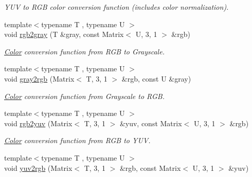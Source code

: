 \begin{DoxyCompactItemize}
\begin{DoxyCompactList}\small\item\em Y\-U\-V to R\-G\-B color conversion function (includes color normalization). \end{DoxyCompactList}\item 
\hypertarget{group___color_conversion_gaaa9282cb999d6cb7301efd2c69b8f921}{{\footnotesize template$<$typename T , typename U $>$ }\\void \hyperlink{group___color_conversion_gaaa9282cb999d6cb7301efd2c69b8f921}{rgb2gray} (T \&gray, const Matrix$<$ U, 3, 1 $>$ \&rgb)}\label{group___color_conversion_gaaa9282cb999d6cb7301efd2c69b8f921}

\begin{DoxyCompactList}\small\item\em \hyperlink{class_d_o_1_1_color}{Color} conversion function from R\-G\-B to Grayscale. \end{DoxyCompactList}\item 
\hypertarget{group___color_conversion_gacf7a6109ede1257816c1157b4d0c1fc1}{{\footnotesize template$<$typename T , typename U $>$ }\\void \hyperlink{group___color_conversion_gacf7a6109ede1257816c1157b4d0c1fc1}{gray2rgb} (Matrix$<$ T, 3, 1 $>$ \&rgb, const U \&gray)}\label{group___color_conversion_gacf7a6109ede1257816c1157b4d0c1fc1}

\begin{DoxyCompactList}\small\item\em \hyperlink{class_d_o_1_1_color}{Color} conversion function from Grayscale to R\-G\-B. \end{DoxyCompactList}\item 
\hypertarget{group___color_conversion_gad19806a92d9d3561e4938aa8076519b3}{{\footnotesize template$<$typename T , typename U $>$ }\\void \hyperlink{group___color_conversion_gad19806a92d9d3561e4938aa8076519b3}{rgb2yuv} (Matrix$<$ T, 3, 1 $>$ \&yuv, const Matrix$<$ U, 3, 1 $>$ \&rgb)}\label{group___color_conversion_gad19806a92d9d3561e4938aa8076519b3}

\begin{DoxyCompactList}\small\item\em \hyperlink{class_d_o_1_1_color}{Color} conversion function from R\-G\-B to Y\-U\-V. \end{DoxyCompactList}\item 
\hypertarget{group___color_conversion_gacd81aedbb5a1d6c2cd01d98da76e0903}{{\footnotesize template$<$typename T , typename U $>$ }\\void \hyperlink{group___color_conversion_gacd81aedbb5a1d6c2cd01d98da76e0903}{yuv2rgb} (Matrix$<$ T, 3, 1 $>$ \&rgb, const Matrix$<$ U, 3, 1 $>$ \&yuv)}\label{group___color_conversion_gacd81aedbb5a1d6c2cd01d98da76e0903}


\end{DoxyCompactItemize}
